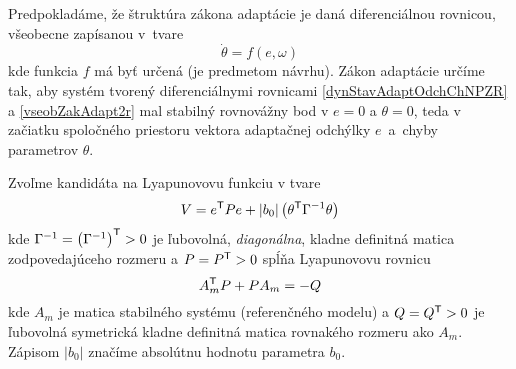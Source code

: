 \documentclass[a4paper, 10pt, ]{article}
\begin{document}
Predpokladáme, že štruktúra zákona adaptácie je daná diferenciálnou rovnicou, všeobecne zapísanou v~tvare
\begin{equation} \label{vseobZakAdapt2r}
    \dot \theta = f \left( e, \omega \right)
\end{equation}
kde funkcia $f$ má byť určená (je predmetom návrhu). Zákon adaptácie určíme tak, aby systém tvorený diferenciálnymi rovnicami \eqref{dynStavAdaptOdchChNPZR} a \eqref{vseobZakAdapt2r} mal stabilný rovnovážny bod v $e = 0$ a $\theta = 0$, teda v začiatku spoločného priestoru vektora adaptačnej odchýlky $e$~a~chyby parametrov $\theta$.

Zvoľme kandidáta na Lyapunovovu funkciu v tvare
\begin{equation} \label{KandLjapFcn2r}
    V = e^{\mathsf{T}} P e + \left| b_0 \right| \left( \theta^{\mathsf{T}} \Gamma^{-1} \theta \right)
\end{equation}
kde $\Gamma^{-1} = \left( \Gamma^{-1} \right)^{\mathsf{T}} > 0$ je ľubovolná, \emph{diagonálna}, kladne definitná matica zodpovedajúceho rozmeru a $P = P^{\mathsf{T}} > 0$ spĺňa Lyapunovovu rovnicu
\begin{equation}
    A_m^{\mathsf{T}} P + P A_m = - Q
\end{equation}
kde $A_m$ je matica stabilného systému (referenčného modelu) a $Q = Q^{\mathsf{T}} > 0$ je ľubovolná symetrická kladne definitná matica rovnakého rozmeru ako $A_m$. Zápisom $\left| b_0 \right|$ značíme absolútnu hodnotu parametra $b_0$.
\end{document}
